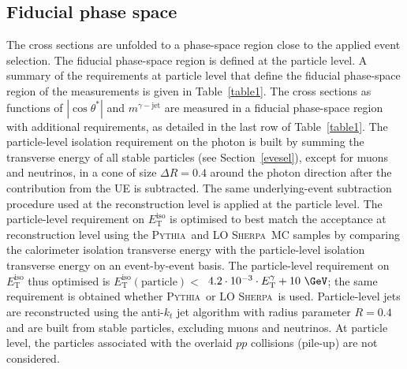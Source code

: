 \documentclass[cernpreprint,texlive=2016,txfonts,UKenglish]{latex/atlasdoc}
\def\etg{E_{\mathrm{T}}^{\gamma}}
\def\mgj{m^{\gamma-{\mathrm{jet}}}}
\def\ctgj{\cos\theta^*}
\def\etiso{E_{\mathrm{T}}^{\mathrm{iso}}}
\def\etisocutp{$4.2\cdot 10^{-3}\cdot \etg +10\ {\mathrm{\GeV}}$}
\def\sher{{\textsc{Sherpa}}}
\def\pyt{{\textsc{Pythia}}}
\begin{document}
\subsection{Fiducial phase space}
\label{fiducial}
The cross sections are unfolded to a phase-space region close to the
applied event selection. The fiducial phase-space region is defined at
the particle level. A summary of the requirements at particle level
that define the fiducial phase-space region of the measurements is
given in Table~\ref{table1}. The cross sections as functions of
$|\ctgj|$ and $\mgj$ are measured in a fiducial phase-space region
with additional requirements, as detailed in the last row of
Table~\ref{table1}. The particle-level isolation requirement on the
photon is built by summing the transverse energy of all stable
particles (see Section~\ref{evesel}), except for muons and neutrinos,
in a cone of size $\Delta R=0.4$ around the photon direction after the
contribution from the UE is subtracted. The same underlying-event
subtraction procedure used at the reconstruction level is applied at
the particle level. The particle-level requirement on $\etiso$ is
optimised to best match the acceptance at reconstruction level using
the \pyt\ and LO \sher\ MC samples by comparing the calorimeter
isolation transverse energy with the particle-level isolation
transverse energy on an event-by-event basis. The particle-level
requirement on $\etiso$ thus optimised is
$\etiso({\mathrm{particle}})<$~\etisocutp; the same requirement is
obtained whether \pyt\ or LO \sher\ is used. Particle-level jets are
reconstructed using the anti-$k_t$ jet algorithm with radius parameter
$R=0.4$ and are built from stable particles, excluding muons and
neutrinos. At particle level, the particles associated with the
overlaid $pp$ collisions (pile-up) are not considered. 
\end{document}
